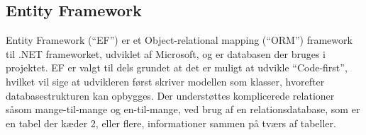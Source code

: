 \subsection{Entity Framework}
Entity Framework (``EF'') er et Object-relational mapping (``ORM'') framework til .NET frameworket, udviklet af Microsoft, og er databasen der bruges i projektet. \citep{EF}
EF er valgt til dels grundet at det er muligt at udvikle ``Code-first'', hvilket vil sige at udvikleren først skriver modellen som klasser, hvorefter databasestrukturen kan opbygges.
Der understøttes komplicerede relationer såsom mange-til-mange og en-til-mange, ved brug af en relationsdatabase, som er en tabel der kæder 2, eller flere, informationer sammen på tværs af tabeller.
